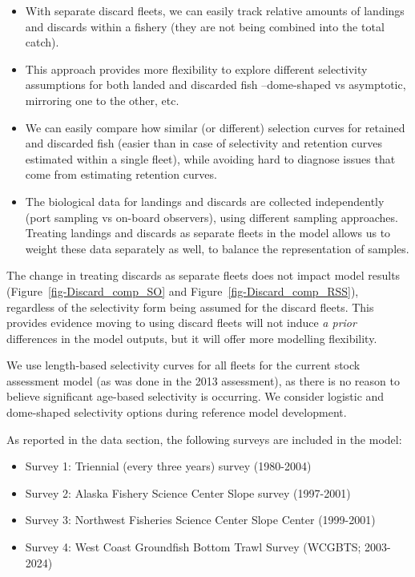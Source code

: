 \documentclass[
]{scrartcl}
\providecommand{\tightlist}{%
  \setlength{\itemsep}{0pt}\setlength{\parskip}{0pt}}\usepackage{longtable,booktabs,array}
\begin{document}
\begin{itemize}
\tightlist
\item
  With separate discard fleets, we can easily track relative amounts of
  landings and discards within a fishery (they are not being combined
  into the total catch).
\item
  This approach provides more flexibility to explore different
  selectivity assumptions for both landed and discarded fish
  --dome-shaped vs asymptotic, mirroring one to the other, etc.
\item
  We can easily compare how similar (or different) selection curves for
  retained and discarded fish (easier than in case of selectivity and
  retention curves estimated within a single fleet), while avoiding hard
  to diagnose issues that come from estimating retention curves.
\item
  The biological data for landings and discards are collected
  independently (port sampling vs on-board observers), using different
  sampling approaches. Treating landings and discards as separate fleets
  in the model allows us to weight these data separately as well, to
  balance the representation of samples.
\end{itemize}

The change in treating discards as separate fleets does not impact model
results (Figure~\ref{fig-Discard_comp_SO} and
Figure~\ref{fig-Discard_comp_RSS}), regardless of the selectivity form
being assumed for the discard fleets. This provides evidence moving to
using discard fleets will not induce \emph{a prior} differences in the
model outputs, but it will offer more modelling flexibility.

We use length-based selectivity curves for all fleets for the current
stock assessment model (as was done in the 2013 assessment), as there is
no reason to believe significant age-based selectivity is occurring. We
consider logistic and dome-shaped selectivity options during reference
model development.

As reported in the data section, the following surveys are included in
the model:

\begin{itemize}
\tightlist
\item
  Survey 1: Triennial (every three years) survey (1980-2004)\\
\item
  Survey 2: Alaska Fishery Science Center Slope survey (1997-2001)
\item
  Survey 3: Northwest Fisheries Science Center Slope Center (1999-2001)
\item
  Survey 4: West Coast Groundfish Bottom Trawl Survey (WCGBTS;
  2003-2024)
\end{itemize}
\end{document}
